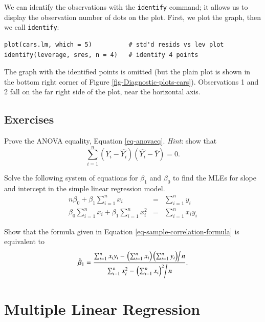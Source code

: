 \documentclass[captions=tableheading]{scrbook}
\begin{document}
We can identify the observations with the \texttt{identify} command; it allows us to display the observation number of dots on the plot. First, we plot the graph, then we call \texttt{identify}:


\lstset{language=R}
\begin{lstlisting}
plot(cars.lm, which = 5)          # std'd resids vs lev plot
identify(leverage, sres, n = 4)   # identify 4 points
\end{lstlisting}

The graph with the identified points is omitted (but the plain plot is shown in the bottom right corner of Figure \ref{fig-Diagnostic-plots-cars}). Observations 1 and 2 fall on the far right side of the plot, near the horizontal axis.

\newpage{}
\section{Exercises}
\label{sec-11-6}

\setcounter{thm}{0}

\begin{xca}
Prove the ANOVA equality, Equation \ref{eq-anovaeq}. \emph{Hint}:
show that
\[
\sum_{i=1}^{n}(Y_{i}-\hat{Y_{i}})(\hat{Y_{i}}-\overline{Y})=0.
\]
\end{xca}

\begin{xca}
Solve the following system of equations for \(\beta_{1}\) and \(\beta_{0}\) to find the MLEs for slope and intercept in the simple linear regression model.
\begin{eqnarray*}
n\beta_{0}+\beta_{1}\sum_{i=1}^{n}x_{i} & = & \sum_{i=1}^{n}y_{i}\\
\beta_{0}\sum_{i=1}^{n}x_{i}+\beta_{1}\sum_{i=1}^{n}x_{i}^{2} & = & \sum_{i=1}^{n}x_{i}y_{i}
\end{eqnarray*}
\end{xca}

\begin{xca}
Show that the formula given in Equation \ref{eq-sample-correlation-formula} is equivalent to
\[
\hat{\beta}_{1} = \frac{\sum_{i=1}^{n}x_{i}y_{i}-\left.\left(\sum_{i=1}^{n}x_{i}\right)\left(\sum_{i=1}^{n}y_{i}\right)\right/ n}{\sum_{i=1}^{n}x_{i}^{2}-\left.\left(\sum_{i=1}^{n}x_{i}\right)^{2}\right/ n}.
\]
\end{xca}
\chapter{Multiple Linear Regression}
\label{sec-12}
\label{cha-multiple-linear-regression}
\end{document}
